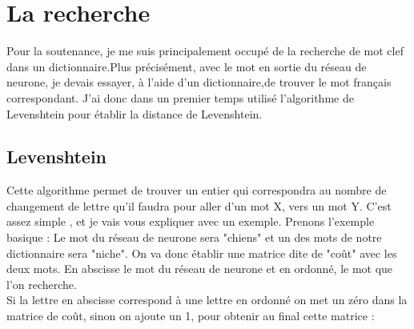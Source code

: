 \documentclass{article}
\begin{document}
       \section {La recherche }
Pour la soutenance, je me suis principalement occupé de la recherche de mot clef dans un dictionnaire.Plus précisément, avec le mot en sortie du réseau de neurone, je devais essayer, à l’aide d’un dictionnaire,de trouver le mot français correspondant. J’ai donc dans un premier temps utilisé l’algorithme de Levenshtein pour établir la distance de Levenshtein.
                \subsection{Levenshtein}
Cette algorithme permet de trouver un entier qui correspondra au nombre de changement de lettre qu’il faudra pour aller d’un mot X, vers un mot Y. C’est assez simple , et je vais vous expliquer avec un exemple. Prenons l’exemple basique : Le mot du réseau de neurone sera "chiens" et un des mots de notre dictionnaire sera "niche". On va donc établir une matrice dite de "coût" avec les deux mots. En abscisse le mot du réseau de neurone et en ordonné, le mot que l’on recherche.\\
Si la lettre en abscisse correspond à une lettre en ordonné on met un zéro dans la matrice de coût, sinon on ajoute un 1, pour obtenir au final cette matrice :
\end{document}
